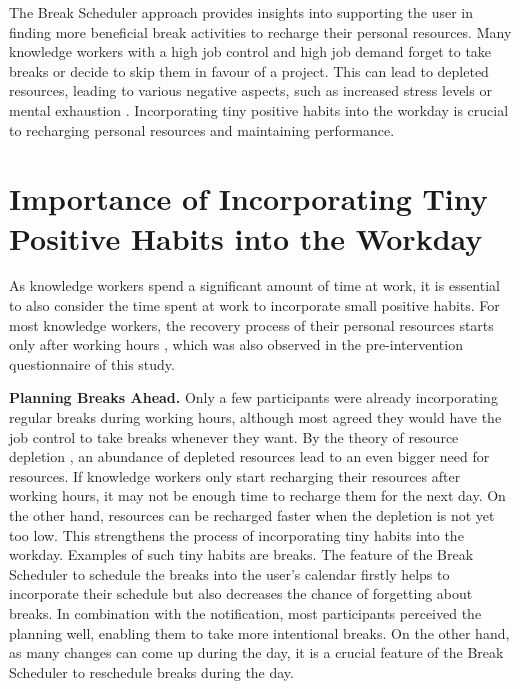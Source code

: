 \documentclass{hasel_thesis}
\begin{document}
The Break Scheduler approach provides insights into supporting the user in finding more beneficial break activities to recharge their personal resources. Many knowledge workers with a high job control and high job demand forget to take breaks or decide to skip them in favour of a project. This can lead to depleted resources, leading to various negative aspects, such as increased stress levels or mental exhaustion \cite{Sonnentag.2001,Trougakos.2009}. Incorporating tiny positive habits into the workday is crucial to recharging personal resources and maintaining performance.

\section{Importance of Incorporating Tiny Positive Habits into the Workday} 
As knowledge workers spend a significant amount of time at work, it is essential to also consider the time spent at work to incorporate small positive habits. For most knowledge workers, the recovery process of their personal resources starts only after working hours \cite{Trougakos.2009}, which was also observed in the pre-intervention questionnaire of this study.

\textbf{Planning Breaks Ahead.}  Only a few participants were already incorporating regular breaks during working hours, although most agreed they would have the job control to take breaks whenever they want. By the theory of resource depletion \cite{BaumeisterR.F.BratslavskyE.MuravenM.&TiceD.M..1998}, an abundance of depleted resources lead to an even bigger need for resources. If knowledge workers only start recharging their resources after working hours, it may not be enough time to recharge them for the next day. On the other hand, resources can be recharged faster when the depletion is not yet too low. This strengthens the process of incorporating tiny habits into the workday. Examples of such tiny habits are breaks. The feature of the Break Scheduler to schedule the breaks into the user's calendar firstly helps to incorporate their schedule but also decreases the chance of forgetting about breaks. In combination with the notification, most participants perceived the planning well, enabling them to take more intentional breaks. On the other hand, as many changes can come up during the day, it is a crucial feature of the Break Scheduler to reschedule breaks during the day. 
\end{document}
